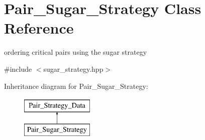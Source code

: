 \hypertarget{class_pair___sugar___strategy}{}\section{Pair\+\_\+\+Sugar\+\_\+\+Strategy Class Reference}
\label{class_pair___sugar___strategy}


ordering critical pairs using the sugar strategy  




{\ttfamily \#include $<$sugar\+\_\+strategy.\+hpp$>$}

Inheritance diagram for Pair\+\_\+\+Sugar\+\_\+\+Strategy\+:\begin{figure}[H]
\begin{center}
\leavevmode
\includegraphics[height=2.000000cm]{class_pair___sugar___strategy}
\end{center}
\end{figure}
